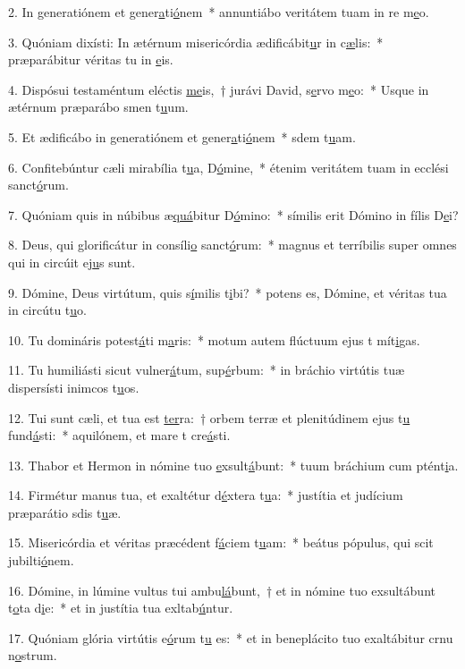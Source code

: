 2. In generatiónem et gener\uline{a}ti\uline{ó}nem~* annuntiábo veritátem tuam in re m\uline{e}o.\par 
3. Quóniam dixísti: In ætérnum misericórdia ædificábit\uline{u}r in c\uline{æ}lis:~* præparábitur véritas tu in \uline{e}is.\par 
4. Dispósui testaméntum eléctis \uline{me}is,~† jurávi David, s\uline{e}rvo m\uline{e}o:~* Usque in ætérnum præparábo smen t\uline{u}um.\par 
5. Et ædificábo in generatiónem et gener\uline{a}ti\uline{ó}nem~* sdem t\uline{u}am.\par 
6. Confitebúntur cæli mirabília t\uline{u}a, D\uline{ó}mine,~* étenim veritátem tuam in ecclési sanct\uline{ó}rum.\par 
7. Quóniam quis in núbibus æ\uline{quá}bitur D\uline{ó}mino:~* símilis erit Dómino in fílis D\uline{e}i?\par 
8. Deus, qui glorificátur in consíli\uline{o} sanct\uline{ó}rum:~* magnus et terríbilis super omnes qui in circúit ej\uline{u}s sunt.\par 
9. Dómine, Deus virtútum, quis s\uline{í}milis t\uline{i}bi?~* potens es, Dómine, et véritas tua in circútu t\uline{u}o.\par 
10. Tu domináris potest\uline{á}ti m\uline{a}ris:~* motum autem flúctuum ejus t mít\uline{i}gas.\par 
11. Tu humiliásti sicut vulner\uline{á}tum, sup\uline{é}rbum:~* in bráchio virtútis tuæ dispersísti inimcos t\uline{u}os.\par 
12. Tui sunt cæli, et tua est \uline{ter}ra:~† orbem terræ et plenitúdinem ejus t\uline{u} fund\uline{á}sti:~* aquilónem, et mare t cre\uline{á}sti.\par 
13. Thabor et Hermon in nómine tuo \uline{e}xsult\uline{á}bunt:~* tuum bráchium cum ptént\uline{i}a.\par 
14. Firmétur manus tua, et exaltétur d\uline{é}xtera t\uline{u}a:~* justítia et judícium præparátio sdis t\uline{u}æ.\par 
15. Misericórdia et véritas præcédent f\uline{á}ciem t\uline{u}am:~* beátus pópulus, qui scit jubilti\uline{ó}nem.\par 
16. Dómine, in lúmine vultus tui ambu\uline{lá}bunt,~† et in nómine tuo exsultábunt t\uline{o}ta d\uline{i}e:~* et in justítia tua exltab\uline{ú}ntur.\par 
17. Quóniam glória virtútis e\uline{ó}rum t\uline{u} es:~* et in beneplácito tuo exaltábitur crnu n\uline{o}strum.\par 
